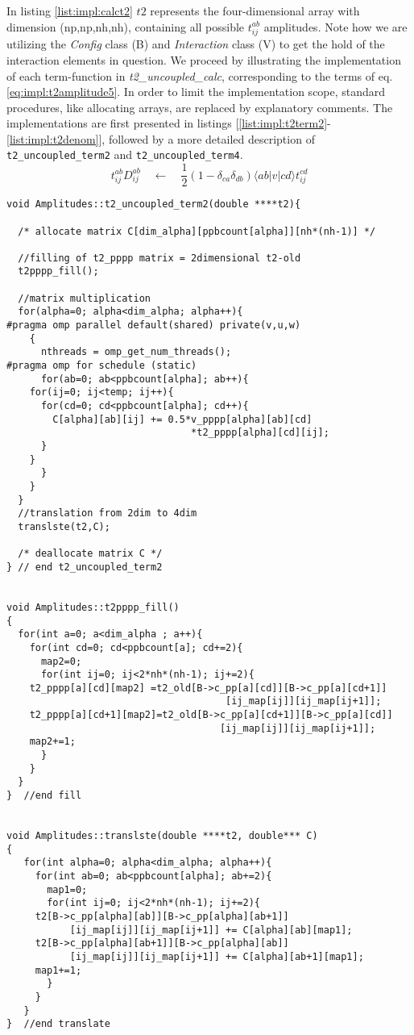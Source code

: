 %
In listing \ref{list:impl:calct2} $t2$ represents the four-dimensional array with dimension (np,np,nh,nh), containing all possible $t_{ij}^{ab}$ amplitudes. Note how we are utilizing the \emph{Config} class (B) and \emph{Interaction} class (V) to get the hold of the interaction elements in question. We proceed by illustrating the implementation of each term-function in \emph{t2\_uncoupled\_calc}, corresponding to the terms of eq. \ref{eq:impl:t2amplitude5}. In order to limit the implementation scope, standard procedures, like allocating arrays, are replaced by explanatory comments. The implementations are first presented in listings [\ref{list:impl:t2term2}-\ref{list:impl:t2denom}], followed by a more detailed description of \texttt{t2\_uncoupled\_term2} and \texttt{t2\_uncoupled\_term4}.
%
\begin{equation}
t_{ij}^{ab}D_{ij}^{ab}\quad \leftarrow \quad \frac{1}{2}(1-\delta_{ca}\delta_{db})\langle ab|v|cd\rangle t_{ij}^{cd}\nonumber
\end{equation}
%
\begin{lstlisting}[label={list:impl:t2term2},caption={implementation of the amp1 class function t2\_uncoupled\_term2()}]
void Amplitudes::t2_uncoupled_term2(double ****t2){

  /* allocate matrix C[dim_alpha][ppbcount[alpha]][nh*(nh-1)] */
  
  //filling of t2_pppp matrix = 2dimensional t2-old
  t2pppp_fill();
  
  //matrix multiplication
  for(alpha=0; alpha<dim_alpha; alpha++){
#pragma omp parallel default(shared) private(v,u,w) 
    {      
      nthreads = omp_get_num_threads();
#pragma omp for schedule (static)
      for(ab=0; ab<ppbcount[alpha]; ab++){
	for(ij=0; ij<temp; ij++){
	  for(cd=0; cd<ppbcount[alpha]; cd++){
	    C[alpha][ab][ij] += 0.5*v_pppp[alpha][ab][cd]
                                *t2_pppp[alpha][cd][ij];
	  }
	}
      } 
    }
  }
  //translation from 2dim to 4dim
  translste(t2,C);
  
  /* deallocate matrix C */
} // end t2_uncoupled_term2


void Amplitudes::t2pppp_fill()
{
  for(int a=0; a<dim_alpha ; a++){
    for(int cd=0; cd<ppbcount[a]; cd+=2){
      map2=0;
      for(int ij=0; ij<2*nh*(nh-1); ij+=2){
	t2_pppp[a][cd][map2] =t2_old[B->c_pp[a][cd]][B->c_pp[a][cd+1]]
                                      [ij_map[ij]][ij_map[ij+1]];
	t2_pppp[a][cd+1][map2]=t2_old[B->c_pp[a][cd+1]][B->c_pp[a][cd]]
                                     [ij_map[ij]][ij_map[ij+1]];
	map2+=1;
      }
    }
  }
}  //end fill


void Amplitudes::translste(double ****t2, double*** C)
{
   for(int alpha=0; alpha<dim_alpha; alpha++){
     for(int ab=0; ab<ppbcount[alpha]; ab+=2){
       map1=0;
       for(int ij=0; ij<2*nh*(nh-1); ij+=2){
	 t2[B->c_pp[alpha][ab]][B->c_pp[alpha][ab+1]]
           [ij_map[ij]][ij_map[ij+1]] += C[alpha][ab][map1];
	 t2[B->c_pp[alpha][ab+1]][B->c_pp[alpha][ab]]
           [ij_map[ij]][ij_map[ij+1]] += C[alpha][ab+1][map1];
	 map1+=1;
       }
     }
   }
}  //end translate
\end{lstlisting}
